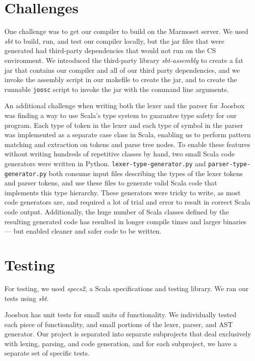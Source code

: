 \documentclass[letterpaper]{article}
\begin{document}
  \section{Challenges}

  One challenge was to get our compiler to build on the Marmoset server. We used
  {\em sbt} to build, run, and test our compiler locally, but the jar files that
  were generated had third-party dependencies that would not run on the CS
  environment. We introduced the third-party library {\em sbt-assembly} to
  create a fat jar that contains our compiler and all of our third party
  dependencies, and we invoke the assembly script in our makefile to create the
  jar, and to create the runnable {\tt joosc} script to invoke the jar with the
  command line arguments.

  An additional challenge when writing both the lexer and the parser for
  Joosbox was finding a way to use Scala's type system to guarantee type
  safety for our program. Each type of token in the lexer and each type of
  symbol in the parser was implemented as a separate case class in Scala,
  enabling us to perform pattern matching and extraction on tokens and parse
  tree nodes. To enable these features without writing hundreds of repetitive
  classes by hand, two small Scala code generators were written in Python.
  {\tt lexer-type-generator.py} and {\tt parser-type-generator.py} both
  consume input files describing the types of the lexer tokens and parser
  tokens, and use these files to generate valid Scala code that implements
  this type hierarchy. These generators were tricky to write, as most code
  generators are, and required a lot of trial and error to result in correct
  Scala code output. Additionally, the huge number of Scala classes defined by
  the resulting generated code has resulted in longer compile times and larger
  binaries --- but enabled cleaner and safer code to be written.

  \section{Testing}

  For testing, we used {\em specs2}, a Scala specifications and testing library.
  We ran our tests using {\em sbt}.

  Joosbox has unit tests for small units of functionality. We individually
  tested each piece of functionality, and small portions of the lexer, parser,
  and AST generator. Our project is separated into separate subprojects that
  deal exclusively with lexing, parsing, and code generation, and for each
  subproject, we have a separate set of specific tests.
\end{document}
